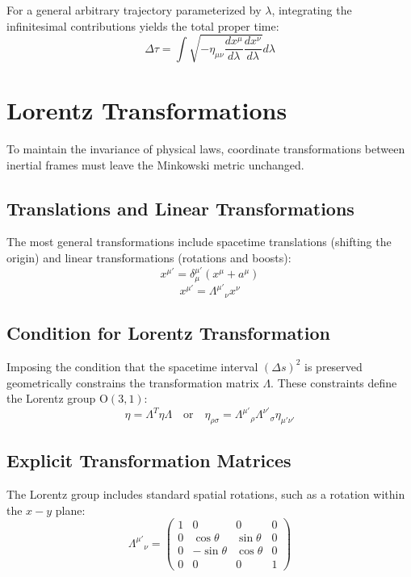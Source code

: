 \documentclass[11pt, a4paper]{report}
\begin{document}
For a general arbitrary trajectory parameterized by $\lambda$, integrating the infinitesimal contributions yields the total proper time:
\begin{equation}
\Delta \tau = \int \sqrt{ -\eta_{\mu\nu} \frac{dx^\mu}{d\lambda} \frac{dx^\nu}{d\lambda} } d\lambda
\end{equation}

\section{Lorentz Transformations}
To maintain the invariance of physical laws, coordinate transformations between inertial frames must leave the Minkowski metric unchanged.

\subsection*{Translations and Linear Transformations}
The most general transformations include spacetime translations (shifting the origin) and linear transformations (rotations and boosts):
\begin{equation}\label{eq:translation}
x^{\mu'} = \delta^{\mu'}_\mu (x^\mu + a^\mu)
\end{equation}
\begin{equation}\label{eq:linear-transform}
x^{\mu'} = {\Lambda^{\mu'}}_\nu x^\nu
\end{equation}

\subsection*{Condition for Lorentz Transformation}
Imposing the condition that the spacetime interval $(\Delta s)^2$ is preserved geometrically constrains the transformation matrix $\Lambda$. These constraints define the Lorentz group $\text{O}(3,1)$:
\begin{equation}\label{eq:lorentz-condition}
\eta = \Lambda^T \eta \Lambda \quad \text{or} \quad \eta_{\rho\sigma} = {\Lambda^{\mu'}}_\rho {\Lambda^{\nu'}}_\sigma \eta_{\mu'\nu'}
\end{equation}

\subsection*{Explicit Transformation Matrices}
The Lorentz group includes standard spatial rotations, such as a rotation within the $x-y$ plane:
\begin{equation}\label{eq:rotation-matrix}
{\Lambda^{\mu'}}_{\nu} =
\begin{pmatrix}
1 & 0 & 0 & 0 \\
0 & \cos\theta & \sin\theta & 0 \\
0 & -\sin\theta & \cos\theta & 0 \\
0 & 0 & 0 & 1
\end{pmatrix}
\end{equation}
\end{document}
